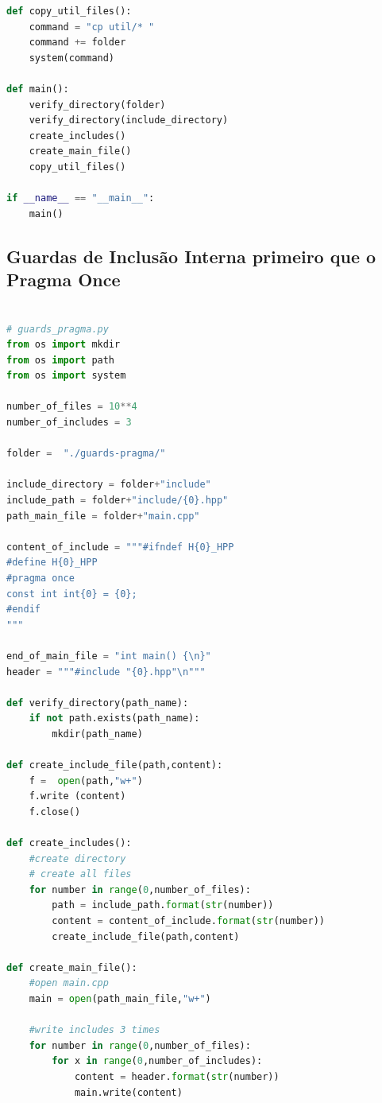 \begin{apendicesenv}
\begin{lstlisting}[language=Python,caption={
              Script Guardas de Inclusão Interna},
                     label=script_intenal_include]
def copy_util_files():                                                           
    command = "cp util/* "                                                       
    command += folder                                                            
    system(command)      

def main():
    verify_directory(folder)
    verify_directory(include_directory)
    create_includes()
    create_main_file()
    copy_util_files()

if __name__ == "__main__":
    main()
\end{lstlisting}

\subsection{Guardas de Inclusão Interna primeiro que o Pragma Once}
\begin{lstlisting}[language=Python, caption={
Script Guardas de Inclusão Interna primeiro que \textit{Pragma Once}},
                   label=script_guards_pragma_include]
                   
# guards_pragma.py
from os import mkdir
from os import path
from os import system

number_of_files = 10**4
number_of_includes = 3

folder =  "./guards-pragma/"

include_directory = folder+"include"
include_path = folder+"include/{0}.hpp"
path_main_file = folder+"main.cpp"

content_of_include = """#ifndef H{0}_HPP
#define H{0}_HPP
#pragma once
const int int{0} = {0};
#endif
"""

end_of_main_file = "int main() {\n}"
header = """#include "{0}.hpp"\n"""

def verify_directory(path_name):
    if not path.exists(path_name):
        mkdir(path_name)

def create_include_file(path,content):
    f =  open(path,"w+")
    f.write (content)
    f.close()

def create_includes():
    #create directory
    # create all files
    for number in range(0,number_of_files):
        path = include_path.format(str(number))
        content = content_of_include.format(str(number))
        create_include_file(path,content)
    
def create_main_file():
    #open main.cpp
    main = open(path_main_file,"w+")

    #write includes 3 times
    for number in range(0,number_of_files):
        for x in range(0,number_of_includes):
            content = header.format(str(number))
            main.write(content)


\end{lstlisting}
\end{apendicesenv}
